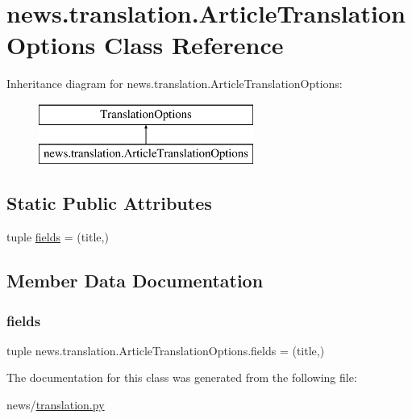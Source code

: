 \hypertarget{classnews_1_1translation_1_1_article_translation_options}{}\section{news.\+translation.\+Article\+Translation\+Options Class Reference}
\label{classnews_1_1translation_1_1_article_translation_options}
Inheritance diagram for news.\+translation.\+Article\+Translation\+Options\+:\begin{figure}[H]
\begin{center}
\leavevmode
\includegraphics[height=2.000000cm]{classnews_1_1translation_1_1_article_translation_options}
\end{center}
\end{figure}
\subsection*{Static Public Attributes}
\begin{DoxyCompactItemize}
\item 
tuple \mbox{\hyperlink{classnews_1_1translation_1_1_article_translation_options_abda1e033b96cad8a40f2ccb6f5c7cc42}{fields}} = (\textquotesingle{}title\textquotesingle{},)
\end{DoxyCompactItemize}


\subsection{Member Data Documentation}
\mbox{\label{classnews_1_1translation_1_1_article_translation_options_abda1e033b96cad8a40f2ccb6f5c7cc42}} 
\subsubsection{\texorpdfstring{fields}{fields}}
{\footnotesize\ttfamily tuple news.\+translation.\+Article\+Translation\+Options.\+fields = (\textquotesingle{}title\textquotesingle{},)\hspace{0.3cm}{\ttfamily [static]}}



The documentation for this class was generated from the following file\+:\begin{DoxyCompactItemize}
\item 
news/\mbox{\hyperlink{translation_8py}{translation.\+py}}\end{DoxyCompactItemize}
